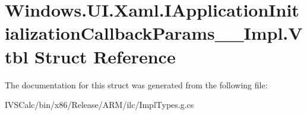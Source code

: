 \hypertarget{struct_windows_1_1_u_i_1_1_xaml_1_1_i_application_initialization_callback_params_____impl_1_1_vtbl}{}\section{Windows.\+U\+I.\+Xaml.\+I\+Application\+Initialization\+Callback\+Params\+\_\+\+\_\+\+Impl.\+Vtbl Struct Reference}
\label{struct_windows_1_1_u_i_1_1_xaml_1_1_i_application_initialization_callback_params_____impl_1_1_vtbl}


The documentation for this struct was generated from the following file\+:\begin{DoxyCompactItemize}
\item 
I\+V\+S\+Calc/bin/x86/\+Release/\+A\+R\+M/ilc/Impl\+Types.\+g.\+cs\end{DoxyCompactItemize}
